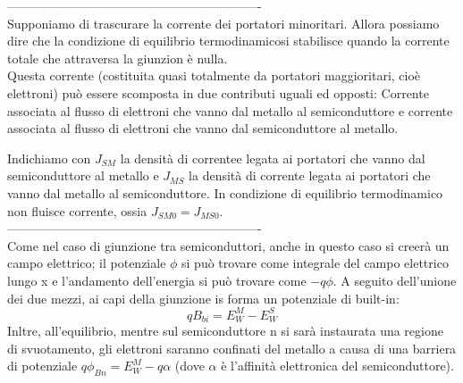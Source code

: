 %
-------------------------------------------------------------\\
Supponiamo di trascurare la corrente dei portatori minoritari. Allora possiamo dire che la condizione di equilibrio termodinamicosi stabilisce quando la corrente totale che attraversa la giunzion è nulla.\\
Questa corrente (costituita quasi totalmente da portatori maggioritari, cioè elettroni) può essere scomposta in due contributi uguali ed opposti:
Corrente associata al flusso di elettroni che vanno dal metallo al semiconduttore e corrente associata al flusso di elettroni che vanno dal semiconduttore al metallo.

Indichiamo con $J_{SM}$ la densità di correntee legata ai portatori che vanno dal semiconduttore al metallo e $J_{MS}$ la densità di corrente legata ai portatori che vanno dal metallo al semiconduttore.
In condizione di equilibrio termodinamico non fluisce corrente, ossia $J_{SM0}=J_{MS0}$.\\
-------------------------------------------------------------\\
Come nel caso di giunzione tra semiconduttori, anche in questo caso si creerà un campo elettrico; il potenziale $\phi$ si può trovare come integrale del campo elettrico lungo x e l'andamento dell'energia si può trovare come $-q\phi$.
A seguito dell'unione dei due mezzi, ai capi della giunzione is forma un potenziale di built-in:
\begin{equation}
    qB_{bi}=E_W^M-E_W^S
\end{equation}
Inltre, all'equilibrio, mentre sul semiconduttore n si sarà instaurata una regione di svuotamento, gli elettroni saranno confinati del metallo a causa di una barriera di potenziale $q\phi_{Bn}=E_W^M-q\alpha$
(dove $\alpha$ è l'affinità elettronica del semiconduttore).\\
